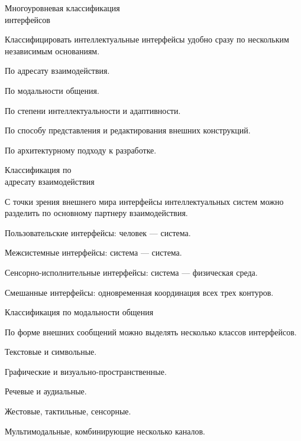 \begin{frame}{Многоуровневая классификация\\ интерфейсов}
	\topline
	\justifying

	Классифицировать интеллектуальные интерфейсы удобно сразу по нескольким независимым основаниям.
	
	\begin{textitemize}
		\item По адресату взаимодействия.
		\item По модальности общения.
		\item По степени интеллектуальности и адаптивности.
		\item По способу представления и редактирования внешних конструкций.
		\item По архитектурному подходу к разработке.
	\end{textitemize}
\end{frame}

\begin{frame}{Классификация по\\ адресату взаимодействия}
	\topline
	\justifying

	С точки зрения внешнего мира интерфейсы интеллектуальных систем можно разделить по основному партнеру взаимодействия.
	
	\begin{textitemize}
		\item Пользовательские интерфейсы: человек --- система.
		\item Межсистемные интерфейсы: система --- система.
		\item Сенсорно-исполнительные интерфейсы: система --- физическая среда.
		\item Смешанные интерфейсы: одновременная координация всех трех контуров.
	\end{textitemize}
\end{frame}

\begin{frame}{Классификация по модальности общения}
	\topline
	\justifying

	По форме внешних сообщений можно выделять несколько классов интерфейсов.
	
	\begin{textitemize}
		\item Текстовые и символьные.
		\item Графические и визуально-пространственные.
		\item Речевые и аудиальные.
		\item Жестовые, тактильные, сенсорные.
		\item Мультимодальные, комбинирующие несколько каналов.
	\end{textitemize}
\end{frame}


